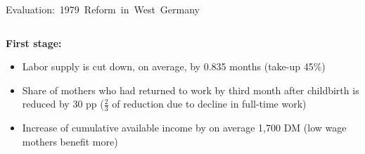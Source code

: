 \documentclass[aspectratio=169,handout]{beamer} %
\begin{document}
\begin{frame}{\mbox{Evaluation: 1979 Reform in West Germany}}
\begin{columns}
\normalsize
\end{columns}\pause
\vspace{0.5 em}
\textbf{First stage:}
\begin{itemize}
\item Labor supply is cut down, on average, by 0.835 months (take-up 45\%)
\item Share of mothers who had returned to work by third month after childbirth is reduced by 30 pp ($\tfrac{2}{3}$ of reduction due to decline in full-time work)
\item Increase of cumulative available income by on average 1,700 DM (low wage mothers benefit more)
\end{itemize}
\end{frame}

%			
%			
%	
%
%
%	
\end{document}
